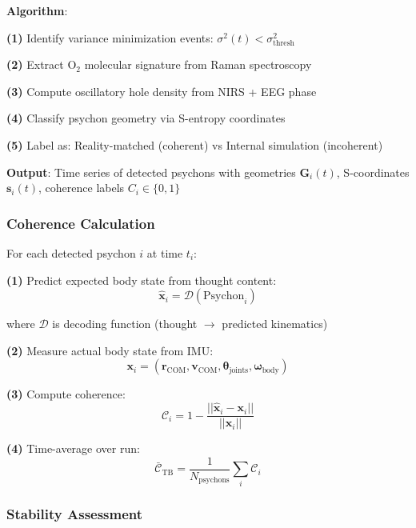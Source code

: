 \documentclass[11pt,onecolumn]{article}
\begin{document}
\textbf{Algorithm}:

\textbf{(1)} Identify variance minimization events: $\sigma^2(t) <  \sigma_{\text{thresh}}^2$

\textbf{(2)} Extract O$_2$ molecular signature from Raman spectroscopy

\textbf{(3)} Compute oscillatory hole density from NIRS + EEG phase

\textbf{(4)} Classify psychon geometry via S-entropy coordinates

\textbf{(5)} Label as: Reality-matched (coherent) vs Internal simulation (incoherent)

\textbf{Output}: Time series of detected psychons with geometries $\mathbf{G}_i(t)$, S-coordinates $\mathbf{s}_i(t)$, coherence labels $C_i \in \{0, 1\}$

\subsubsection{Coherence Calculation}

For each detected psychon $i$ at time $t_i$:

\textbf{(1)} Predict expected body state from thought content:
\begin{equation}
\hat{\mathbf{x}}_i = \mathcal{D}(\text{Psychon}_i)
\end{equation}

where $\mathcal{D}$ is decoding function (thought $\to$ predicted kinematics)

\textbf{(2)} Measure actual body state from IMU:
\begin{equation}
\mathbf{x}_i = (\mathbf{r}_{\text{COM}}, \mathbf{v}_{\text{COM}}, \boldsymbol{\theta}_{\text{joints}}, \boldsymbol{\omega}_{\text{body}})
\end{equation}

\textbf{(3)} Compute coherence:
\begin{equation}
\mathcal{C}_i = 1 - \frac{||\hat{\mathbf{x}}_i - \mathbf{x}_i||}{||\mathbf{x}_i||}
\end{equation}

\textbf{(4)} Time-average over run:
\begin{equation}
\bar{\mathcal{C}}_{\text{TB}} = \frac{1}{N_{\text{psychons}}}\sum_i \mathcal{C}_i
\end{equation}

\subsubsection{Stability Assessment}
\end{document}
